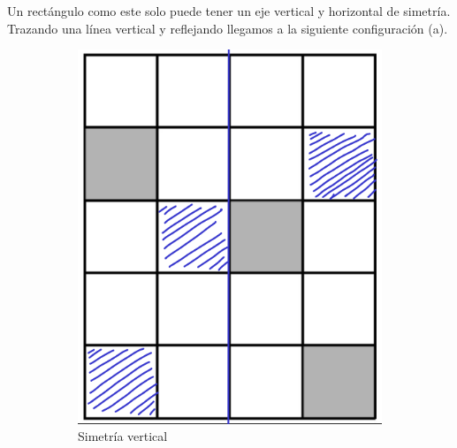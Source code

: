 \newpage

\begin{solution}[(Problema 1)]
    Un rectángulo como este solo puede tener un eje vertical y horizontal de simetría.
    Trazando una línea vertical y reflejando llegamos a la siguiente configuración (a).
    \begin{figure}[H]
        \centering
        \begin{subfigure}{0.27\textwidth}
            \includegraphics[width=\textwidth]{content/figure4}
            \caption{Simetría vertical}
        \end{subfigure}
        \hspace{1cm}
        \begin{subfigure}{0.27\textwidth}

\end{subfigure}
\end{figure}
\end{solution}
